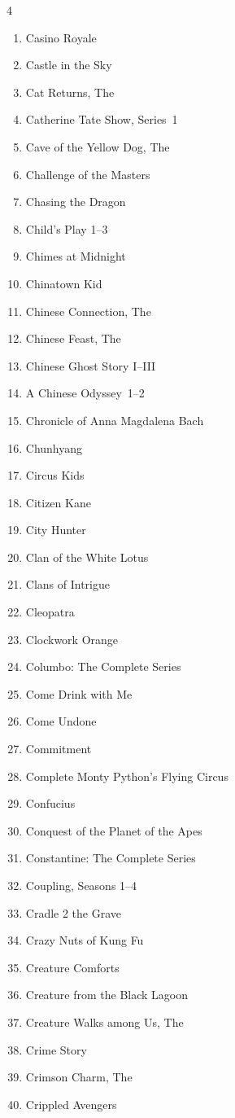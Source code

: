 \documentclass{article}
\begin{document}
\begin{multicols}{4}
\begin{enumerate}
\item Casino Royale
\item Castle in the Sky
\item Cat Returns, The
\item Catherine Tate Show, Series~1
\item Cave of the Yellow Dog, The
\item Challenge of the Masters
\item Chasing the Dragon
\item Child's Play 1--3
\item Chimes at Midnight
\item Chinatown Kid
\item Chinese Connection, The
\item Chinese Feast, The
\item Chinese Ghost Story I--III
\item A Chinese Odyssey~1--2
\item Chronicle of Anna Magdalena Bach
\item Chunhyang
\item Circus Kids
\item Citizen Kane
\item City Hunter
\item Clan of the White Lotus
\item Clans of Intrigue
\item Cleopatra
\item Clockwork Orange
\item Columbo: The Complete Series
\item Come Drink with Me
\item Come Undone
\item Commitment
\item Complete Monty Python's Flying Circus
\item Confucius
\item Conquest of the Planet of the Apes
\item Constantine: The Complete Series
\item Coupling, Seasons 1--4
\item Cradle 2 the Grave
\item Crazy Nuts of Kung Fu
\item Creature Comforts
\item Creature from the Black Lagoon
\item Creature Walks among Us, The
\item Crime Story
\item Crimson Charm, The
\item Crippled Avengers

\end{enumerate}
\end{multicols}
\end{document}

